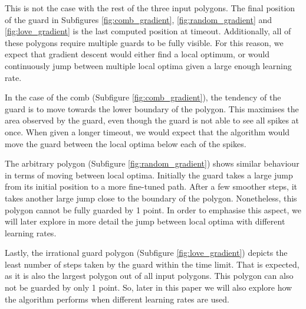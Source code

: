 This is not the case with the rest of the three input polygons. The final position of the guard in Subfigures \ref{fig:comb_gradient}, \ref{fig:random_gradient} and \ref{fig:love_gradient} is the last computed position at timeout. Additionally, all of these polygons require multiple guards to be fully visible. For this reason, we expect that gradient descent would either find a local optimum, or would continuously jump between multiple local optima given a large enough learning rate.

In the case of the comb (Subfigure \ref{fig:comb_gradient}), the tendency of the guard is to move towards the lower boundary of the polygon. This maximises the area observed by the guard, even though the guard is not able to see all spikes at once. When given a longer timeout, we would expect that the algorithm would move the guard between the local optima below each of the spikes.

The arbitrary polygon (Subfigure \ref{fig:random_gradient}) shows similar behaviour in terms of moving between local optima. Initially the guard takes a large jump from its initial position to a more fine-tuned path. After a few smoother steps, it takes another large jump close to the boundary of the polygon. Nonetheless, this polygon cannot be fully guarded by 1 point. In order to emphasise this aspect, we will later explore in more detail the jump between local optima with different learning rates.

Lastly, the irrational guard polygon (Subfigure \ref{fig:love_gradient}) depicts the least number of steps taken by the guard within the time limit. That is expected, as it is also the largest polygon out of all input polygons. This polygon can also not be guarded by only 1 point. So, later in this paper we will also explore how the algorithm performs when different learning rates are used. 


